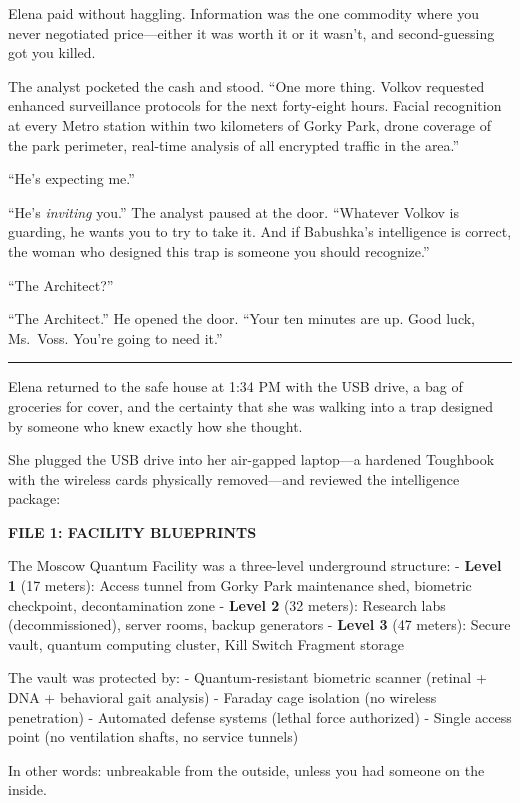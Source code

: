 \documentclass[12pt,letterpaper]{book}
\begin{document}
Elena paid without haggling. Information was the one commodity where you never negotiated price---either it was worth it or it wasn't, and second-guessing got you killed.

The analyst pocketed the cash and stood. ``One more thing. Volkov requested enhanced surveillance protocols for the next forty-eight hours. Facial recognition at every Metro station within two kilometers of Gorky Park, drone coverage of the park perimeter, real-time analysis of all encrypted traffic in the area.''

``He's expecting me.''

``He's \emph{inviting} you.'' The analyst paused at the door. ``Whatever Volkov is guarding, he wants you to try to take it. And if Babushka's intelligence is correct, the woman who designed this trap is someone you should recognize.''

``The Architect?''

``The Architect.'' He opened the door. ``Your ten minutes are up. Good luck, Ms.~Voss. You're going to need it.''

\begin{center}\rule{0.5\linewidth}{0.5pt}\end{center}

Elena returned to the safe house at 1:34 PM with the USB drive, a bag of groceries for cover, and the certainty that she was walking into a trap designed by someone who knew exactly how she thought.

She plugged the USB drive into her air-gapped laptop---a hardened Toughbook with the wireless cards physically removed---and reviewed the intelligence package:

\textbf{FILE 1: FACILITY BLUEPRINTS}

The Moscow Quantum Facility was a three-level underground structure: - \textbf{Level 1} (17 meters): Access tunnel from Gorky Park maintenance shed, biometric checkpoint, decontamination zone - \textbf{Level 2} (32 meters): Research labs (decommissioned), server rooms, backup generators - \textbf{Level 3} (47 meters): Secure vault, quantum computing cluster, Kill Switch Fragment storage

The vault was protected by: - Quantum-resistant biometric scanner (retinal + DNA + behavioral gait analysis) - Faraday cage isolation (no wireless penetration) - Automated defense systems (lethal force authorized) - Single access point (no ventilation shafts, no service tunnels)

In other words: unbreakable from the outside, unless you had someone on the inside.
\end{document}
